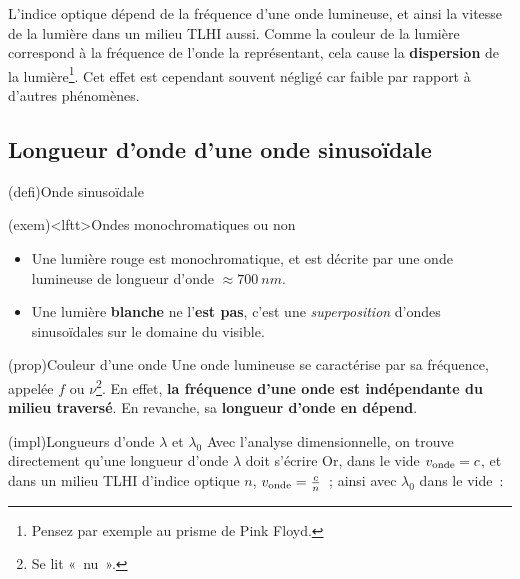 \documentclass[../../main/main.tex]{subfiles}
\begin{document}
L'indice optique dépend de la fréquence d'une onde lumineuse, et ainsi la
vitesse de la lumière dans un milieu TLHI aussi. Comme la couleur de la lumière
correspond à la fréquence de l'onde la représentant, cela cause la
\textbf{dispersion} de la lumière\footnote{Pensez par exemple au prisme de Pink
	Floyd.}. Cet effet est cependant souvent négligé car faible par rapport à
d'autres phénomènes.

\subsection{Longueur d'onde d'une onde sinusoïdale}

\begin{tcb*}(defi){Onde sinusoïdale}
\end{tcb*}

\begin{tcb}(exem)<lftt>{Ondes monochromatiques ou non}
	\begin{itemize}
		\item Une lumière rouge est monochromatique, et est décrite par une onde
		      lumineuse de longueur d'onde $\approx \SI{700}{nm}$.
		\item Une lumière \textbf{blanche} ne
		      l'\textbf{est pas}, c'est une \textit{superposition} d'ondes
		      sinusoïdales sur le domaine du visible.
	\end{itemize}
\end{tcb}

\begin{tcb*}(prop){Couleur d'une onde}
	Une onde lumineuse se caractérise par sa fréquence, appelée $f$ ou
	$\nu$\footnote{Se lit «~nu~».}. En effet, \textbf{la fréquence d'une
		onde est indépendante du milieu traversé}.
	\smallbreak
	En revanche, sa \textbf{longueur d'onde en dépend}.
\end{tcb*}

\begin{tcb*}[sidebyside](impl){Longueurs d'onde $\lambda$ et $\lambda_0$}
	Avec l'analyse dimensionnelle, on trouve directement qu'une longueur
	d'onde $\lambda$ doit s'écrire
	\psw{%
		\[
			\lambda = \frac{v_{\rm onde}}{f_{\rm onde}}
		\]
	}%
	\tcblower
	Or, dans le vide $v_{\rm onde} = c$, et dans un milieu TLHI d'indice
	optique $n$, $v_{\rm onde} = \frac{c}{n}$~; ainsi avec $\lambda_0$ dans
	le vide~:
	\psw{%
		\[
			\boxed{\lambda_0 = \frac{c}{f}}
			\quad\text{et}\quad
			\boxed{\lambda = \frac{c}{n\times f} = \frac{\lambda_0}{n}}
		\]
	}%
\end{tcb*}
\end{document}
